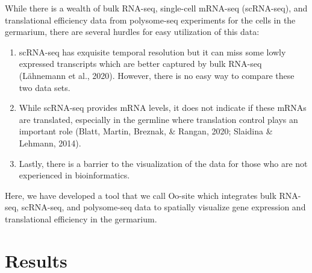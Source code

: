 \documentclass[12pt,oneside]{reedthesis}
\begin{document}
While there is a wealth of bulk RNA-seq, single-cell mRNA-seq
(scRNA-seq), and translational efficiency data from polysome-seq
experiments for the cells in the germarium, there are several hurdles
for easy utilization of this data:
\begin{enumerate}
\def\labelenumi{\arabic{enumi}.}
\item
  scRNA-seq has exquisite temporal resolution but it can miss some
  lowly expressed transcripts which are better captured by bulk
  RNA-seq (Lähnemann et al., 2020). However, there is
  no easy way to compare these two data sets.
\item
  While scRNA-seq provides mRNA levels, it does not indicate if these
  mRNAs are translated, especially in the germline where translation
  control plays an important role
  (Blatt, Martin, Breznak, \& Rangan, 2020; Slaidina \& Lehmann, 2014).
\item
  Lastly, there is a barrier to the visualization of the data for
  those who are not experienced in bioinformatics.
\end{enumerate}
Here, we have developed a tool that we call Oo-site which integrates
bulk RNA-seq, scRNA-seq, and polysome-seq data to spatially visualize
gene expression and translational efficiency in the germarium.

\hypertarget{results-1}{%
\section{Results}\label{results-1}}
\end{document}
